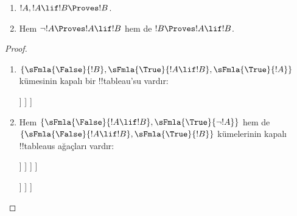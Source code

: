 \documentclass[../../../include/open-logic-section]{subfiles}
\begin{document}
\begin{prop}
  \begin{enumerate}
  \item {}  $!A, !A \lif !B \Proves !B$.
  \item {}
    Hem $\lnot !A \Proves !A \lif !B$ hem de $!B \Proves !A \lif !B$.
  \end{enumerate}
\end{prop}

\begin{proof}
  \begin{enumerate}
    \item $\{\sFmla{\False}{!B}, \sFmla{\True}{!A \lif !B},
      \sFmla{\True}{!A}\}$ kümesinin kapalı bir !!{tableau}'su vardır:
      \begin{oltableau}
        [\sFmla{\False}{\formula{B}}, just=\TAss
          [\sFmla{\True}{\formula{A} \lif \formula{B}}, just=\TAss
            [\sFmla{\True}{\formula{A}}, just=\TAss
              [\sFmla{\False}{\formula{A}}, just = {\TRule{\True}{\lif}[2]}, close]
              [\sFmla{\True}{\formula{B}}, just = {\TRule{\True}{\lif}[2]}, close]
            ]
          ]
        ]
      \end{oltableau}
    \item Hem $\{\sFmla{\False}{!A \lif !B},
      \sFmla{\True}{\lnot !A}\}$ hem de $\{\sFmla{\False}{!A \lif !B},
      \sFmla{\True}{!B}\}$ kümelerinin kapalı !!{tableau}s ağaçları vardır:
      \begin{oltableau}
        [\sFmla{\False}{\formula{A} \lif \formula{B}}, just = \TAss
          [\sFmla{\True}{\lnot \formula{A}}, just = \TAss
            [\sFmla{\True}{\formula{A}}, just = {\TRule{\False}{\lif}[1]}
              [\sFmla{\False}{\formula{B}}, just = {\TRule{\False}{\lif}[1]}
                [\sFmla{\False}{\formula{A}}, just = {\TRule{\True}{\lnot}[2]}, close]
              ]
            ]
          ]
        ]
      \end{oltableau}
      \begin{oltableau}
        [\sFmla{\False}{\formula{A} \lif \formula{B}}, just = \TAss
          [\sFmla{\True}{\formula{B}}, just = \TAss
            [\sFmla{\True}{\formula{A}}, just = {\TRule{\False}{\lif}[1]}
              [\sFmla{\False}{\formula{B}}, just = {\TRule{\False}{\lif}[1]},close
              ]
            ]
          ]
        ]
      \end{oltableau}
  \end{enumerate}
\end{proof}
\end{document}
